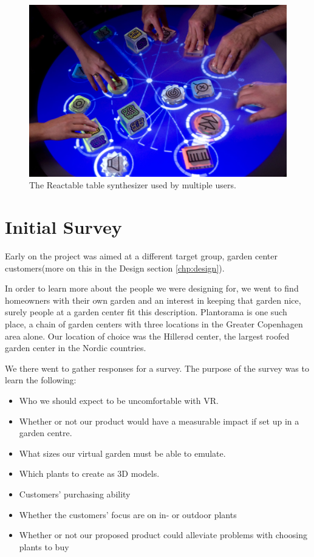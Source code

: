 				\begin{figure}[H]
					\centering
					\includegraphics[width=0.6\linewidth]{figure/Analysis/reactable}
					\caption{The Reactable table synthesizer used by multiple users.}
					\label{fig:reactable}
				\end{figure} 
		
		
			\section{Initial Survey}\label{sec:initialSurvey}
			Early on the project was aimed at a different target group, garden center customers(more on this in the Design section \ref{chp:design}).

			In order to learn more about the people we were designing for, we went to find homeowners with their own garden and an interest in keeping that garden nice, surely people at a garden center fit this description. Plantorama is one such place, a chain of garden centers with three locations in the Greater Copenhagen area alone. Our location of choice was the Hillerød center, the largest roofed garden center in the Nordic countries. 
			
			We there went to gather responses for a survey. 
			The purpose of the survey was to learn the following:
			
			\begin{itemize}
				\item Who we should expect to be uncomfortable with VR.
				\item Whether or not our product would have a measurable impact if set up in a garden centre.
				\item What sizes our virtual garden must be able to emulate.
				\item Which plants to create as 3D models.
				\item Customers' purchasing ability
				\item Whether the customers' focus are on in- or outdoor plants
				\item Whether or not our proposed product could alleviate problems with choosing plants to buy
			\end{itemize}
